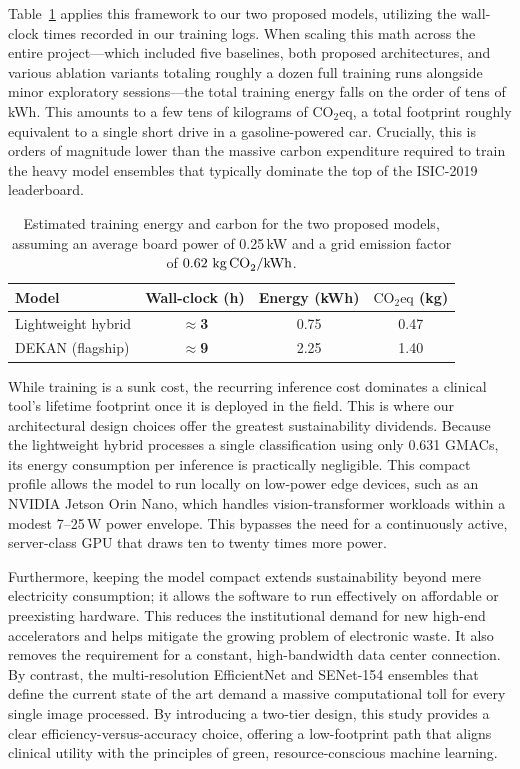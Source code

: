 Table~\ref{tab:carbon} applies this framework to our two proposed models, utilizing the wall-clock times recorded in our training logs. When scaling this math across the entire project—which included five baselines, both proposed architectures, and various ablation variants totaling roughly a dozen full training runs alongside minor exploratory sessions—the total training energy falls on the order of tens of kWh. This amounts to a few tens of kilograms of $\text{CO}_2\text{eq}$, a total footprint roughly equivalent to a single short drive in a gasoline-powered car. Crucially, this is orders of magnitude lower than the massive carbon expenditure required to train the heavy model ensembles that typically dominate the top of the ISIC-2019 leaderboard.

\begin{table}[H]
\centering
\caption{Estimated training energy and carbon for the two proposed models, assuming an average board power of 0.25\,kW and a grid emission factor of $0.62\ \text{kg\,CO}_2/\text{kWh}$.}
\label{tab:carbon}
\small
\begin{tabularx}{\textwidth}{>{\raggedright\arraybackslash}Xccc}
\toprule
Model & Wall-clock (h) & Energy (kWh) & $\text{CO}_2\text{eq}$ (kg) \\
\midrule
Lightweight hybrid & \textbf{$\approx$3} & 0.75 & 0.47 \\
DEKAN (flagship)   & \textbf{$\approx$9} & 2.25 & 1.40 \\
\bottomrule
\end{tabularx}
\end{table}

While training is a sunk cost, the recurring inference cost dominates a clinical tool's lifetime footprint once it is deployed in the field. This is where our architectural design choices offer the greatest sustainability dividends. Because the lightweight hybrid processes a single classification using only 0.631 GMACs, its energy consumption per inference is practically negligible. This compact profile allows the model to run locally on low-power edge devices, such as an NVIDIA Jetson Orin Nano, which handles vision-transformer workloads within a modest 7--25\,W power envelope. This bypasses the need for a continuously active, server-class GPU that draws ten to twenty times more power. 

Furthermore, keeping the model compact extends sustainability beyond mere electricity consumption; it allows the software to run effectively on affordable or preexisting hardware. This reduces the institutional demand for new high-end accelerators and helps mitigate the growing problem of electronic waste. It also removes the requirement for a constant, high-bandwidth data center connection. By contrast, the multi-resolution EfficientNet and SENet-154 ensembles that define the current state of the art demand a massive computational toll for every single image processed. By introducing a two-tier design, this study provides a clear efficiency-versus-accuracy choice, offering a low-footprint path that aligns clinical utility with the principles of green, resource-conscious machine learning.

